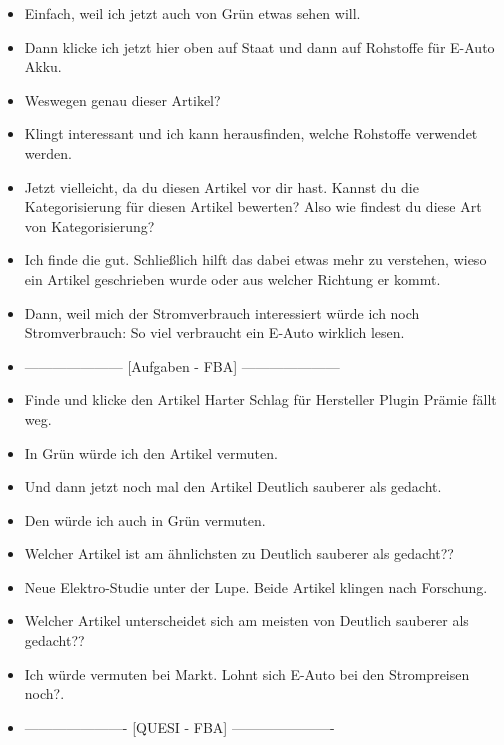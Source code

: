 {\begin{itemize}[]
        \item {} Einfach, weil ich jetzt auch von Grün etwas sehen will.
        \item {} Dann klicke ich jetzt hier oben auf Staat und dann auf \flqq Rohstoffe für E-Auto Akku\frqq{}.
        \item {} Weswegen genau dieser Artikel?
        \item {} Klingt interessant und ich kann herausfinden, welche Rohstoffe verwendet werden.
        \item {} Jetzt vielleicht, da du diesen Artikel vor dir hast.
              Kannst du die Kategorisierung für diesen Artikel bewerten?
              Also wie findest du diese Art von Kategorisierung?
        \item {} Ich finde die gut.
              Schließlich hilft das dabei etwas mehr zu verstehen, wieso ein Artikel geschrieben wurde oder aus welcher Richtung er kommt.
        \item {} Dann, weil mich der Stromverbrauch interessiert würde ich noch \flqq Stromverbrauch: So viel verbraucht ein E-Auto wirklich\frqq{} lesen.
        \item {---------------------} [Aufgaben - FBA] {---------------------}
        \item {} Finde und klicke den Artikel \flqq Harter Schlag für Hersteller Plugin Prämie fällt weg\frqq{}.
        \item {} In Grün würde ich den Artikel vermuten.
        \item {} Und dann jetzt noch mal den Artikel \flqq Deutlich sauberer als gedacht\frqq{}.
        \item {} Den würde ich auch in Grün vermuten.
        \item {} Welcher Artikel ist am ähnlichsten zu \flqq Deutlich sauberer als gedacht?\frqq{}?
        \item {} \flqq Neue Elektro-Studie unter der Lupe\frqq{}. Beide Artikel klingen nach Forschung.
        \item {} Welcher Artikel unterscheidet sich am meisten von \flqq Deutlich sauberer als gedacht?\frqq{}?
        \item {} Ich würde vermuten bei Markt. \flqq Lohnt sich E-Auto bei den Strompreisen noch?\frqq{}.
        \item {----------------------} [QUESI - FBA] {----------------------}

\end{itemize}}
